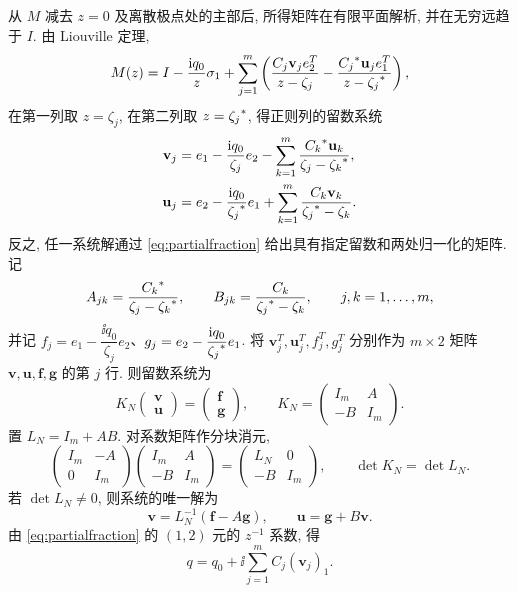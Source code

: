 \label{prop:finite}
从 $M$ 减去 $z=0$ 及离散极点处的主部后, 所得矩阵在有限平面解析, 并在无穷远趋于 $I$.
由 Liouville 定理,
\begin{equation}\label{eq:partialfraction}
M(z)=I-\dfrac{\mathrm{i} q_0}{z}\sigma_1+\sum\limits_{j=1}^{m}
\left(\dfrac{C_j\mathbf v_je_2^T}{z-\zeta_j}
-\dfrac{{C_j}^{*}\mathbf u_je_1^T}{z-{\zeta_j}^{*}}\right),
\end{equation}
在第一列取 $z=\zeta_j$, 在第二列取 $z={\zeta_j}^{*}$, 得正则列的留数系统
\begin{align}
\mathbf v_j&=e_1-\dfrac{\mathrm{i} q_0}{\zeta_j}e_2
-\sum\limits_{k=1}^{m}\dfrac{{C_k}^{*}\mathbf u_k}{\zeta_j-{\zeta_k}^{*}},\label{eq:finite1}\\
\mathbf u_j&=e_2-\dfrac{\mathrm{i} q_0}{{\zeta_j}^{*}}e_1
+\sum\limits_{k=1}^{m}\dfrac{C_k\mathbf v_k}{{\zeta_j}^{*}-\zeta_k}.\label{eq:finite2}
\end{align}
反之, 任一系统解通过 \eqref{eq:partialfraction} 给出具有指定留数和两处归一化的矩阵. 记
\begin{equation*}
A_{jk}=\dfrac{{C_k}^{*}}{\zeta_j-{\zeta_k}^{*}},\qquad
B_{jk}=\dfrac{C_k}{{\zeta_j}^{*}-\zeta_k},\qquad j,k=1,\ldots,m,
\end{equation*}
并记 $f_j=e_1-\dfrac{\ii q_0}{\zeta_j}e_2$、$g_j=e_2-\dfrac{\mathrm{i} q_0}{{\zeta_j}^{*}}e_1$. 将 $\mathbf v_j^T,\mathbf u_j^T,f_j^T,g_j^T$ 分别作为 $m\times2$ 矩阵 $\boldsymbol v,\boldsymbol u,\boldsymbol f,\boldsymbol g$ 的第 $j$ 行. 则留数系统为
\begin{equation}\label{eq:N-block-system}
K_N\begin{pmatrix}\boldsymbol v\\\boldsymbol u\end{pmatrix}
=\begin{pmatrix}\boldsymbol f\\\boldsymbol g\end{pmatrix},\qquad
K_N=\begin{pmatrix}I_m&A\\-B&I_m\end{pmatrix}.
\end{equation}
置 $L_N=I_m+AB$. 对系数矩阵作分块消元,
\begin{equation*}
\begin{pmatrix}I_m&-A\\0&I_m\end{pmatrix}
\begin{pmatrix}I_m&A\\-B&I_m\end{pmatrix}
=\begin{pmatrix}L_N&0\\-B&I_m\end{pmatrix},
\qquad \det K_N=\det L_N.
\end{equation*}
若 $\det L_N\ne0$, 则系统的唯一解为
\begin{equation}\label{eq:finite-schur}
\boldsymbol v=L_N^{-1}(\boldsymbol f-A\boldsymbol g),\qquad
\boldsymbol u=\boldsymbol g+B\boldsymbol v.
\end{equation}
由 \eqref{eq:partialfraction} 的 $(1,2)$ 元的 $z^{-1}$ 系数, 得
\begin{equation}\label{eq:qfinite}
q=q_0+\ii\sum\limits_{j=1}^{m}C_j(\mathbf v_j)_1.
\end{equation}

